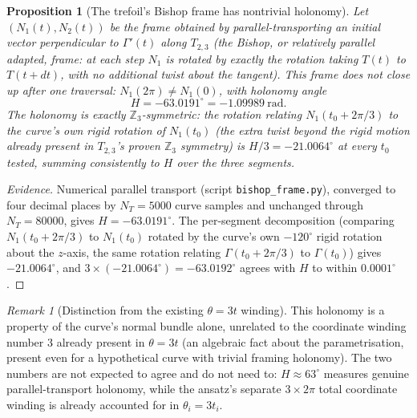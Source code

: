 \documentclass[11pt,a4paper]{article}
\newtheorem{proposition}[theorem]{Proposition}
\theoremstyle{definition}\newtheorem{definition}[theorem]{Definition}
\theoremstyle{remark}
\newtheorem{remark}[theorem]{Remark}
\theoremstyle{definition}\newtheorem{construction}[theorem]{Construction}
\begin{document}
\begin{proposition}[The trefoil's Bishop frame has nontrivial holonomy]
\label{P16:prop:bishop_holonomy}
Let $(N_1(t),N_2(t))$ be the frame obtained by parallel-transporting
an initial vector perpendicular to $\Gamma'(t)$ along $T_{2,3}$ (the
Bishop, or relatively parallel adapted, frame: at each step $N_1$ is
rotated by exactly the rotation taking $T(t)$ to $T(t+dt)$, with no
additional twist about the tangent). This frame does not close up
after one traversal: $N_1(2\pi)\neq N_1(0)$, with holonomy angle
\begin{equation}
  H = -63.0191^\circ = -1.09989~\mathrm{rad}.
  \label{P16:eq:bishop_holonomy}
\end{equation}
The holonomy is exactly $\mathbb{Z}_3$-symmetric: the rotation
relating $N_1(t_0+2\pi/3)$ to the curve's own rigid rotation of
$N_1(t_0)$ (the extra twist beyond the rigid motion already present
in $T_{2,3}$'s proven $\mathbb{Z}_3$ symmetry) is $H/3=-21.0064^\circ$
at every $t_0$ tested, summing consistently to $H$ over the three
segments.
\end{proposition}

\begin{proof}[Evidence]
Numerical parallel transport (script \texttt{bishop\_frame.py}),
converged to four decimal places by $N_T=5000$ curve samples and
unchanged through $N_T=80000$, gives $H=-63.0191^\circ$. The
per-segment decomposition (comparing $N_1(t_0+2\pi/3)$ to
$N_1(t_0)$ rotated by the curve's own $-120^\circ$ rigid rotation
about the $z$-axis, the same rotation relating $\Gamma(t_0+2\pi/3)$ to
$\Gamma(t_0)$) gives $-21.0064^\circ$, and $3\times(-21.0064^\circ)=
-63.0192^\circ$ agrees with $H$ to within $0.0001^\circ$.
\end{proof}

\begin{remark}[Distinction from the existing $\theta=3t$ winding]
\label{P16:rem:holonomy_distinct}
This holonomy is a property of the curve's normal bundle alone,
unrelated to the coordinate winding number $3$ already present in
$\theta=3t$ (an algebraic fact about the parametrisation, present even
for a hypothetical curve with trivial framing holonomy). The two
numbers are not expected to agree and do not need to: $H\approx
63^\circ$ measures genuine parallel-transport holonomy, while the
ansatz's separate $3\!\times\!2\pi$ total coordinate winding is
already accounted for in $\theta_i=3t_i$.
\end{remark}
\end{document}
